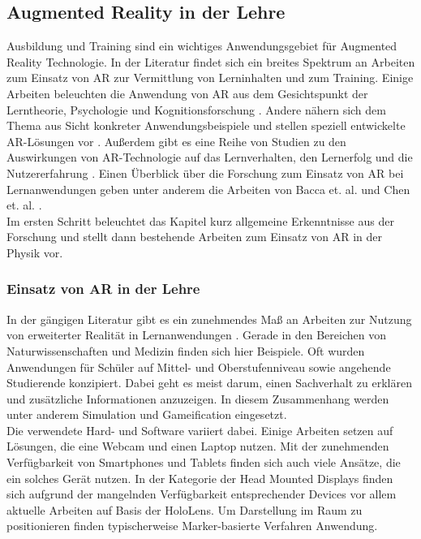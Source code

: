 \subsection{Augmented Reality in der Lehre}
\label{sec-2-2}
Ausbildung und Training sind ein wichtiges Anwendungsgebiet für Augmented Reality Technologie. In der Literatur findet sich ein breites Spektrum an Arbeiten zum Einsatz von AR zur Vermittlung von Lerninhalten und zum Training. Einige Arbeiten beleuchten die Anwendung von AR aus dem Gesichtspunkt der Lerntheorie, Psychologie und Kognitionsforschung \cite{Marichal17, Santos14}. Andere nähern sich dem Thema aus Sicht konkreter Anwendungsbeispiele und stellen speziell entwickelte AR-Lösungen vor \cite{Strzys17, Amiraslanov18, Buchau09, Hughes05}. Außerdem gibt es eine Reihe von Studien zu den Auswirkungen von AR-Technologie auf das Lernverhalten, den Lernerfolg und die Nutzererfahrung \cite{Ibanez14, Li11, Jerry10, Akcayir16, Strzys18}. Einen Überblick über die Forschung zum Einsatz von AR bei Lernanwendungen geben unter anderem die Arbeiten von Bacca et. al. und Chen et. al. \cite{Chen2017, Bacca14}.\\

Im ersten Schritt beleuchtet das Kapitel kurz allgemeine Erkenntnisse aus der Forschung und stellt dann bestehende Arbeiten zum Einsatz von AR in der Physik vor.

\subsubsection{Einsatz von AR in der Lehre}
\label{sec-2-2-1}
In der gängigen Literatur gibt es ein zunehmendes Maß an Arbeiten zur Nutzung von erweiterter Realität in Lernanwendungen \cite{Bacca14, Ibanez18}. Gerade in den Bereichen von Naturwissenschaften und Medizin finden sich hier Beispiele. Oft wurden Anwendungen für Schüler auf Mittel- und Oberstufenniveau sowie angehende Studierende konzipiert. Dabei geht es meist darum, einen Sachverhalt zu erklären und zusätzliche Informationen anzuzeigen. In diesem Zusammenhang werden unter anderem Simulation und Gameification eingesetzt.\\

Die verwendete Hard- und Software variiert dabei. Einige Arbeiten setzen auf Lösungen, die eine Webcam und einen Laptop nutzen. Mit der zunehmenden Verfügbarkeit von Smartphones und Tablets finden sich auch viele Ansätze, die ein solches Gerät nutzen. In der Kategorie der Head Mounted Displays finden sich aufgrund der mangelnden Verfügbarkeit entsprechender Devices vor allem aktuelle Arbeiten auf Basis der HoloLens. Um Darstellung im Raum zu positionieren finden typischerweise Marker-basierte Verfahren Anwendung.\\

